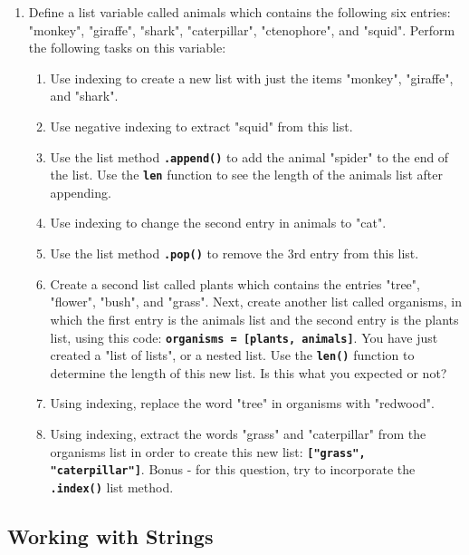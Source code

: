 \documentclass{article}[12pt]
\newcommand{\code}[1]{\textbf{\texttt{#1}}}
\begin{document}
\begin{enumerate}[itemsep=5ex]
	
	\item Define a list variable called animals which contains the following six entries: "monkey", "giraffe", "shark", "caterpillar", "ctenophore", and "squid". Perform the following tasks on this variable:
	\begin{enumerate}[itemsep=2ex]
		
		\item Use indexing to create a new list with just the items "monkey", "giraffe", and "shark".
		\item Use negative indexing to extract "squid" from this list.
		\item Use the list method \code{.append()} to add the animal "spider" to the end of the list. Use the \code{len} function to see the length of the animals list after appending.
		\item Use indexing to change the second entry in animals to "cat".
		\item Use the list method \code{.pop()} to remove the 3rd entry from this list. 
		\item Create a second list called plants which contains the entries "tree", "flower", "bush", and "grass". Next, create another list called organisms, in which the first entry is the animals list and the second entry is the plants list, using this code: \code{organisms = [plants, animals]}. You have just created a "list of lists", or a nested list. Use the \code{len()} function to determine the length of this new list. Is this what you expected or not?
		\item Using indexing, replace the word "tree" in organisms with "redwood". 
		\item Using indexing, extract the words "grass" and "caterpillar" from the organisms list in order to create this new list: \code{["grass", "caterpillar"]}. Bonus - for this question, try to incorporate the \code{.index()} list method.
	\end{enumerate}

	
	
\end{enumerate}

\vspace{1.5cm}

\subsection{Working with Strings}
\end{document}
